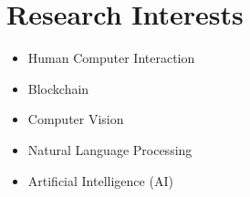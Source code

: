 	
\section{Research Interests}

\begin{multicols}{5}
	\small
	\begin{itemize}
		\item Human Computer Interaction
		\item Blockchain
		\item Computer Vision
		\item Natural Language Processing
		\item Artificial Intelligence (AI)

	\end{itemize}
\end{multicols}